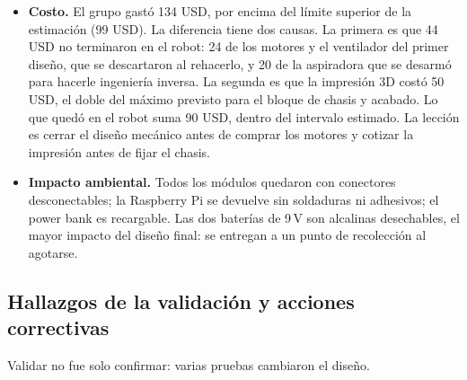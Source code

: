 \documentclass[11pt,a4paper]{article}
\begin{document}
\begin{itemize}
  \item \textbf{Costo.} El grupo gastó 134 USD, por encima del límite
        superior de la estimación (99 USD). La diferencia tiene dos causas.
        La primera es que 44 USD no terminaron en el robot: 24 de los motores
        y el ventilador del primer diseño, que se descartaron al rehacerlo, y
        20 de la aspiradora que se desarmó para hacerle ingeniería inversa.
        La segunda es que la impresión 3D costó 50 USD, el doble del máximo
        previsto para el bloque de chasis y acabado. Lo que quedó en el robot
        suma 90 USD, dentro del intervalo estimado. La
        lección es cerrar el diseño mecánico antes de comprar los motores y
        cotizar la impresión antes de fijar el chasis.
  \item \textbf{Impacto ambiental.} Todos los módulos quedaron con conectores
        desconectables; la Raspberry Pi se devuelve sin soldaduras ni
        adhesivos; el power bank es recargable. Las dos baterías de 9\,V
        son alcalinas desechables, el mayor impacto del diseño final: se
        entregan a un punto de recolección al agotarse.
\end{itemize}

\subsection{Hallazgos de la validación y acciones correctivas}
\label{sec:hallazgos}

Validar no fue solo confirmar: varias pruebas cambiaron el diseño.
\end{document}
